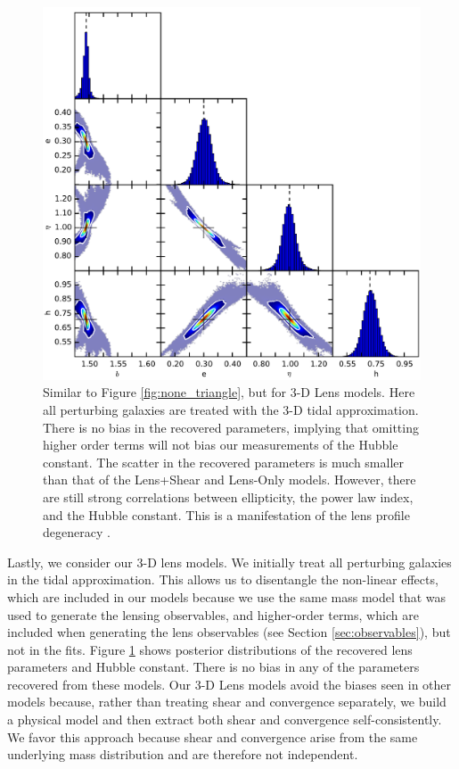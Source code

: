 \documentclass{emulateapj}
\begin{document}
\begin{figure}[ht]
\begin{center}
\includegraphics[width=1\textwidth]{all_los_1e-2.pdf}
\caption{\label{fig:los_triangle} Similar to Figure \ref{fig:none_triangle}, but for 3-D Lens models. Here all perturbing galaxies are treated with the 3-D tidal approximation.  There is no bias in the recovered parameters, implying that omitting higher order terms will not bias our measurements of the Hubble constant. The scatter in the recovered parameters is much smaller than that of the Lens+Shear and Lens-Only models. However, there are still strong correlations between ellipticity, the power law index, and the Hubble constant. This is a manifestation of the lens profile degeneracy \citep{Kochanek02}. %
}
\end{center}
\end{figure}

Lastly, we consider our 3-D lens models. We initially treat all perturbing galaxies in the tidal approximation. This allows us to disentangle the non-linear effects, which are included in our models because we use the same mass model that was used to generate the lensing observables, and higher-order terms, which are included when generating the lens observables (see Section \ref{sec:observables}), but not in the fits. 
Figure \ref{fig:los_triangle} shows posterior distributions of the recovered lens parameters and Hubble constant. There is no bias in any of the parameters recovered from these models. Our 3-D Lens models avoid the biases seen in other models because, rather than treating shear and convergence separately, we build a physical model and then extract both shear and convergence self-consistently. We favor this approach because shear and convergence arise from the same underlying mass distribution and are therefore not independent. 
\end{document}
